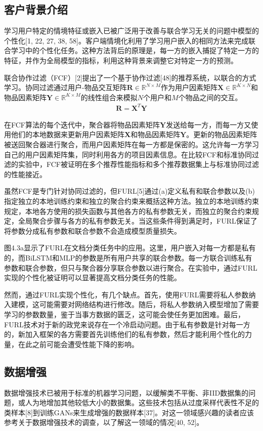\subsection{客户背景介绍}
学习用户特定的情境特征或嵌入已被广泛用于改善与联合学习无关的问题中模型的个性化[1, 22, 27, 38, 58]。客户端情境化利用了学习用户嵌入的相同方法来完成联合学习中的个性化任务。这种方法背后的原理是，每一方的嵌入捕捉了特定一方的特征，并作为全局模型的指标，利用这种背景来调整它对特定一方的预测。

联合协作过滤（FCF）[2]提出了一个基于协作过滤[48]的推荐系统，以联合的方式学习。协同过滤通过用户-物品交互矩阵$\bm{R} \in \mathbb{R}^{N \times M}$作为用户因素矩阵$\bm{X} \in \mathbb{R}^{K \times N}$和物品因素矩阵$\bm{Y} \in \mathbb{R}^{K \times M}$的线性组合来模拟$N$个用户和$M$个物品之间的交互。
\begin{align}
	\bm{R} = \bm{X}^{T}\bm{Y} \label{eq:4-7}
\end{align}

在FCF算法的每个迭代中，聚合器将物品因素矩阵$\bm{Y}$发送给每一方，而每一方又使用他们的本地数据来更新用户因素矩阵$\bm{X}$和物品因素矩阵$\bm{Y}$。更新的物品因素矩阵被送回聚合器进行聚合，而用户因素矩阵在每一方都是保密的。这允许每一方学习自己的用户因素矩阵集，同时利用各方的项目因素信息。在比较FCF和标准协同过滤的实验中，FCF被证明在多个推荐性能指标和多个推荐数据集上与标准协同过滤的性能接近。

虽然FCF是专门针对协同过滤的，但FURL[5]通过(a)定义私有和联合参数以及(b)指定独立的本地训练约束和独立的聚合约束来概括这种方法。独立的本地训练约束规定，本地各方使用的损失函数与其他各方的私有参数无关，而独立的聚合约束规定，全局聚合步骤与各方的私有参数无关。当这些条件得到满足时，FURL保证了将参数分成私有参数和联合参数不会造成模型质量损失。

图4.3a显示了FURL在文档分类任务中的应用。这里，用户嵌入对每一方都是私有的，而BiLSTM和MLP的参数是所有用户共享的联合参数。每一方联合训练私有参数和联合参数，但只与聚合器分享联合参数以进行聚合。在实验中，通过FURL实现的个性化被证明可以显著提高文档分类任务的性能。

然而，通过FURL实现个性化，有几个缺点。首先，使用FURL需要将私人参数纳入建模，这可能需要对网络结构进行修改。随后，将私人参数纳入模型增加了需要学习的参数数量，鉴于当事方数据的匮乏，这可能会使任务更加困难。最后，FURL技术对于新的政党来说存在一个冷启动问题。由于私有参数是针对每一方的，新加入框架的各方需要首先训练他们的私有参数，然后才能利用个性化的力量，在此之前可能会遭受性能下降的影响。

\subsection{数据增强}
数据增强技术已被用于标准的机器学习问题，以缓解类不平衡、非IID数据集的问题，或人为地增加其他较低大小的数据集。这些技术包括从过度采样代表性不足的类样本[8]到训练GANs来生成增强的数据样本[37]。对这一领域感兴趣的读者应该参考关于数据增强技术的调查，以了解这一领域的情况[40, 52]。

